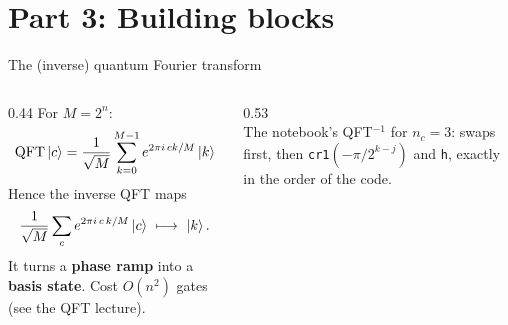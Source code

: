 \documentclass[aspectratio=169,11pt]{beamer}
\newcommand{\key}[1]{{\color{qdark}\textbf{#1}}}
\begin{document}
\section{Part 3: Building blocks}
\begin{frame}{The (inverse) quantum Fourier transform}
  \begin{columns}[T]
    \begin{column}{0.44\textwidth}
      \small For $M = 2^{n}$:
      \[ \mathrm{QFT}\ket c = \frac{1}{\sqrt M}\sum_{k=0}^{M-1}e^{2\pi i\,ck/M}\ket k \]
      Hence the inverse QFT maps
      \[ \frac{1}{\sqrt M}\sum_ce^{2\pi i\,c\,k/M}\ket c\ \longmapsto\ \ket k. \]
      It turns a \key{phase ramp} into a \key{basis state}. Cost $O(n^2)$ gates (see the QFT lecture).
    \end{column}
    \begin{column}{0.53\textwidth}
      \centering\footnotesize
      \\[2mm]
      The notebook's QFT$^{-1}$ for $n_c = 3$: swaps first, then \texttt{cr1}$(-\pi/2^{k-j})$ and \texttt{h}, exactly in the order of the code.
    \end{column}
  \end{columns}
\end{frame}
\end{document}
